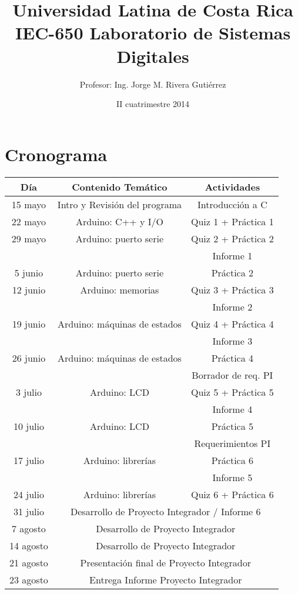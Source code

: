 \documentclass[11pt,letterpaper]{article}
\title{Universidad Latina de Costa Rica\\ IEC-650 Laboratorio de Sistemas Digitales}
\author{Profesor: Ing. Jorge M. Rivera Gutiérrez}
\date{II cuatrimestre 2014}
\begin{document}
\maketitle
\thispagestyle{empty}
\section*{Cronograma}
\begin{center}

  \begin{tabular}{|c|c|c|}\hline

   Día	 	& \multicolumn{1}{c|}{Contenido Temático} & \multicolumn{1}{c|}{Actividades} \\ \hline \hline
   15 mayo	& Intro y Revisión del programa & Introducción a C\\ \hline
   22 mayo	& Arduino: C++ y I/O   		& Quiz 1 + Práctica 1 \\ \hline
   29 mayo	& Arduino: puerto serie		& Quiz 2 + Práctica 2 \\
   			& 							& Informe 1 \\ \hline
   5 junio	& Arduino: puerto serie		& Práctica 2  \\ \hline
   12 junio	& Arduino: memorias   		& Quiz 3 + Práctica 3 \\
      		& 							& Informe 2   \\ \hline
   19 junio	& Arduino: máquinas de estados	& Quiz 4 + Práctica 4  \\
   			& 							& Informe 3 \\\hline	
   26 junio	& Arduino: máquinas de estados	 & Práctica 4 \\
   			& 							& Borrador de req. PI  \\ \hline
   3 julio	& Arduino: LCD					 & Quiz 5 + Práctica 5 \\
   			& 							& Informe 4 \\\hline	   
   10 julio	& Arduino: LCD      		     & Práctica 5 \\
       		& 							& Requerimientos PI  \\ \hline
   17 julio	& Arduino: librerías			& Práctica 6  \\
   			& 							& Informe 5 \\\hline	
   24 julio	& Arduino: librerías	& Quiz 6 + Práctica 6  \\ \hline
   31 julio	& \multicolumn{2}{c|}{Desarrollo de Proyecto Integrador / Informe 6}  \\ \hline
   7 agosto	& \multicolumn{2}{c|}{Desarrollo de Proyecto Integrador}  \\ \hline
   14 agosto& \multicolumn{2}{c|}{Desarrollo de Proyecto Integrador}  \\ \hline
   21 agosto& \multicolumn{2}{c|}{Presentación final de Proyecto Integrador}  \\ \hline
   23 agosto& \multicolumn{2}{c|}{Entrega Informe Proyecto Integrador}  \\ \hline
  \end{tabular}

\end{center}
\end{document}
